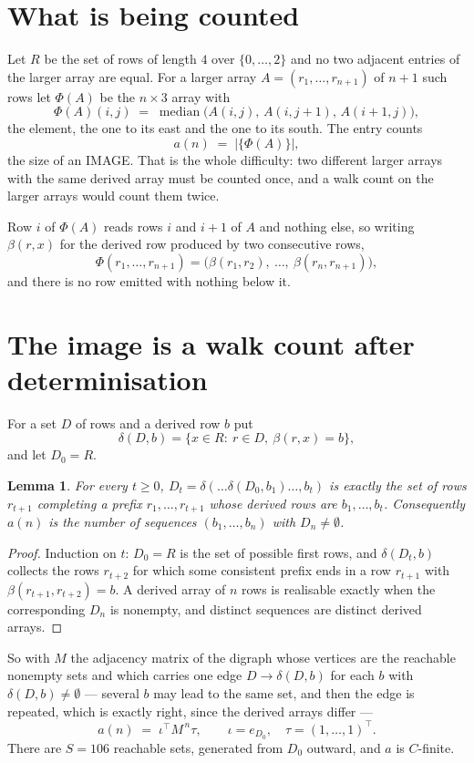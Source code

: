 \documentclass[11pt,a4paper]{article}
\theoremstyle{plain}
\newtheorem{lemma}[theorem]{Lemma}
\theoremstyle{definition}
\begin{document}
\section{What is being counted}

Let $R$ be the set of rows of length $4$ over $\{0,\dots,2\}$ and no two adjacent entries of the larger array are equal.
For a larger array $A=(r_1,\dots,r_{n+1})$ of $n+1$ such rows let $\Phi(A)$ be the
$n\times3$ array with
\[
\Phi(A)(i,j)\;=\;\operatorname{median}\bigl(A(i,j),\,A(i,j+1),\,A(i+1,j)\bigr),
\]
the element, the one to its east and the one to its south. The entry counts
\[
a(n)\;=\;\bigl|\{\Phi(A)\}\bigr| ,
\]
the size of an IMAGE. That is the whole difficulty: two different larger arrays with the same
derived array must be counted once, and a walk count on the larger arrays would count them
twice.

Row $i$ of $\Phi(A)$ reads rows $i$ and $i+1$ of $A$ and nothing else, so
writing $\beta(r,x)$ for the derived row produced by two consecutive rows,
\[
\Phi(r_1,\dots,r_{n+1})=\bigl(\beta(r_1,r_2),\ \dots,\ \beta(r_n,r_{n+1})\bigr),
\]
and there is no row emitted with nothing below it.

\section{The image is a walk count after determinisation}

For a set $D$ of rows and a derived row $b$ put
\[
\delta(D,b)=\{x\in R:\ r\in D,\ \beta(r,x)=b\},
\]
and let $D_0=R$.

\begin{lemma}\label{lem:det}
For every $t\ge0$, $D_t=\delta(\dots\delta(D_0,b_1)\dots,b_t)$ is exactly the set of rows
$r_{t+1}$ completing a prefix $r_1,\dots,r_{t+1}$ whose derived rows are $b_1,\dots,b_t$.
Consequently $a(n)$ is the number of sequences $(b_1,\dots,b_n)$ with $D_n\neq\emptyset$.
\end{lemma}

\begin{proof}
Induction on $t$: $D_0=R$ is the set of possible first rows, and $\delta(D_t,b)$ collects the
rows $r_{t+2}$ for which some consistent prefix ends in a row $r_{t+1}$ with
$\beta(r_{t+1},r_{t+2})=b$. A derived array of $n$ rows is realisable exactly when the
corresponding $D_n$ is nonempty, and distinct sequences are distinct derived arrays.
\end{proof}

So with $M$ the adjacency matrix of the digraph whose vertices are the reachable nonempty sets
and which carries one edge $D\to\delta(D,b)$ for each $b$ with $\delta(D,b)\neq\emptyset$ ---
several $b$ may lead to the same set, and then the edge is repeated, which is exactly right,
since the derived arrays differ ---
\[
a(n)\;=\;\iota^{\!\top}M^{\,n}\tau,\qquad \iota=e_{D_0},\quad \tau=(1,\dots,1)^{\!\top} .
\]
There are $S=106$ reachable sets, generated from $D_0$ outward, and $a$ is $C$-finite.
\end{document}
